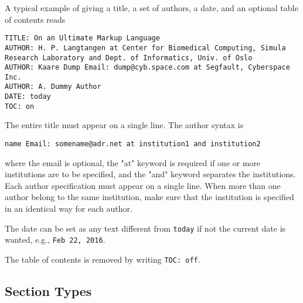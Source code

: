\documentclass[%
oneside,                 %
final,                   %
10pt]{article}
\begin{document}
A typical example of giving a title, a set of authors, a date,
and an optional table of contents
reads
\begin{Verbatim}[numbers=none,fontsize=\fontsize{9pt}{9pt},baselinestretch=0.85,xleftmargin=0mm]
TITLE: On an Ultimate Markup Language
AUTHOR: H. P. Langtangen at Center for Biomedical Computing, Simula Research Laboratory and Dept. of Informatics, Univ. of Oslo
AUTHOR: Kaare Dump Email: dump@cyb.space.com at Segfault, Cyberspace Inc.
AUTHOR: A. Dummy Author
DATE: today
TOC: on
\end{Verbatim}
The entire title must appear on a single line.
The author syntax is
\begin{Verbatim}[numbers=none,fontsize=\fontsize{9pt}{9pt},baselinestretch=0.85,xleftmargin=0mm]
name Email: somename@adr.net at institution1 and institution2
\end{Verbatim}
where the email is optional, the "at" keyword is required if one or
more institutions are to be specified, and the "and" keyword
separates the institutions. Each author specification must appear
on a single line.
When more than one author belong to the
same institution, make sure that the institution is specified in an identical
way for each author.

The date can be set as any text different from \Verb!today! if not the
current date is wanted, e.g., \Verb!Feb 22, 2016!.

The table of contents is removed by writing \Verb!TOC: off!.


\subsection{Section Types}
\label{quick:sections}
\end{document}
